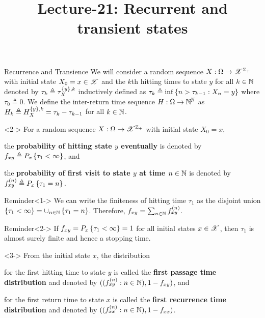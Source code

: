 \documentclass[12pt,aspectratio=169]{beamer}
\title{ Lecture-21: Recurrent and transient states}
\date{}
\begin{document}
\pagestyle{empty}
\maketitle


\begin{frame}{Recurrence and Transience}
We will consider a random sequence $X:\Omega\to\mathscr{X}^{\mathbb{Z}_+}$ with initial state $X_0 = x\in\mathscr{X}$ and the $k$th hitting times to state $y$ for all $k \in \mathbb{N}$ denoted by $\tau_k \triangleq \tau_X^{\left\{y\right\},k}$ inductively defined as $\tau_k \triangleq \inf\left\{n > \tau_{k-1}: X_n = y\right\}$ where $\tau_0 \triangleq 0$. 
We define the inter-return time sequence $H:\Omega\to\mathbb{N}^{\mathbb{N}}$ as $H_k \triangleq H_X^{\left\{y\right\},k} = \tau_k - \tau_{k-1}$ for all $k \in \mathbb{N}$. 
\begin{Definition}<2->
For a random sequence $X: \Omega \to \mathscr{X}^{\mathbb{Z}_+}$ with initial state $X_0 = x$, 
\begin{compactenum}[(i)]
\item<2-> the \textbf{probability of hitting state $y$ eventually} is denoted by 
$f_{xy} \triangleq P_x\left\{\tau_1 < \infty\right\}$, 
and 
\item<3-> the \textbf{probability of first visit to state $y$ at time $n \in\mathbb{N}$} is denoted by 
$f_{xy}^{(n)} 
\triangleq P_x\set{\tau_1 = n}. %
$
\end{compactenum}
\end{Definition}
\end{frame}


\begin{frame}
\begin{block}{Reminder}<1->
We can write the finiteness of hitting time $\tau_1$ as the disjoint union $\left\{\tau_1 < \infty\right\} = \cup_{n \in \mathbb{N}}\left\{\tau_1=n\right\}$. 
Therefore, $f_{xy} = \sum_{n\in\mathbb{N}}f_{xy}^{(n)}$. 
\end{block}
\begin{block}{Reminder}<2->
If $f_{xy} = P_x\left\{\tau_1 < \infty\right\} = 1$ for all initial states $x \in \mathscr{X}$, 
then $\tau_1$ is almost surely finite and hence a stopping time.
\end{block}
\begin{Definition}<3->
From the initial state $x$, the distribution 
\begin{compactenum}[(i)]
\item<3-> for the first hitting time to state $y$ is called the \textbf{first passage time distribution} and denoted by $((f_{xy}^{(n)}: n \in \mathbb{N}), 1 - f_{xy})$, and 
\item<4-> for the first return time to state $x$ is called the \textbf{first recurrence time distribution} and denoted by $((f_{xx}^{(n)}: n \in \mathbb{N}),1 - f_{xx})$. 
\end{compactenum}
\end{Definition}
\end{frame}
\end{document}
